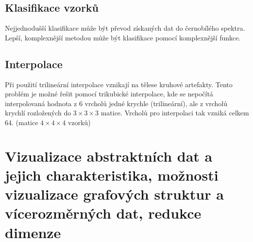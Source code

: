 \documentclass[10pt,a4paper, table]{article}
\begin{document}
\subsection{Klasifikace vzorků}
Nejjednodušší klasifikace může být převod získaných dat do černobílého spektra. Lepší, komplexnější metodou může být klasifikace pomocí komplexnější funkce.
\subsection{Interpolace}
Při použití trilineární interpolace vznikají na tělese kruhové artefakty. Tento problém je možné řešit pomocí trikubické interpolace, kde se nepočítá interpolovaná hodnota z 6 vrcholů jedné krychle (trilineární), ale z vrcholů krychlí rozložených do $3\times3\times3$ matice. Vrcholů pro interpolaci tak vzniká celkem 64. (matice $4\times4\times4$ vzorků)

\clearpage
\section{Vizualizace  abstraktních dat a  jejich  charakteristika, možnosti vizualizace grafových struktur a vícerozměrných dat, redukce dimenze}
\end{document}
